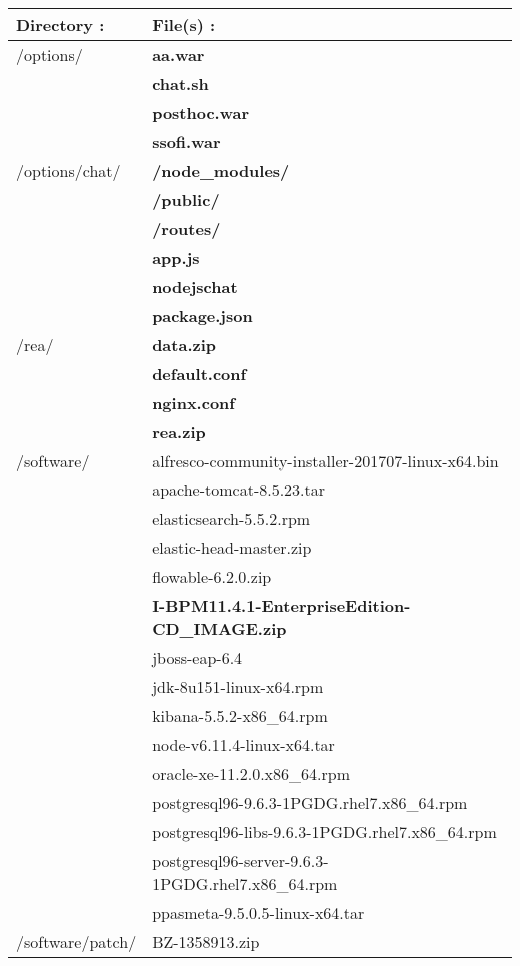 \begin{center}
	\begin{tabular}{|p{2in}|p{4in}|}
	\hline
	\textbf{Directory :} & \textbf{File(s) :}\\
	\hline
	/options/ & \textbf{aa.war}\\
	& \textbf{chat.sh}\\
	& \textbf{posthoc.war}\\
	& \textbf{ssofi.war}\\
	/options/chat/ & \textbf{/node\_modules/}\\
	& \textbf{/public/}\\
	& \textbf{/routes/}\\
	& \textbf{app.js}\\
	& \textbf{nodejschat}\\
	& \textbf{package.json}\\
	\hline
	/rea/ & \textbf{data.zip}\\
	& \textbf{default.conf}\\
	& \textbf{nginx.conf}\\
	& \textbf{rea.zip}\\
	\hline
	/software/ & alfresco-community-installer-201707-linux-x64.bin\\
	& apache-tomcat-8.5.23.tar\\
	& elasticsearch-5.5.2.rpm\\
	& elastic-head-master.zip\\
	& flowable-6.2.0.zip\\
	& \textbf{I-BPM11.4.1-EnterpriseEdition-CD\_IMAGE.zip}\\
	& jboss-eap-6.4\\
	& jdk-8u151-linux-x64.rpm\\
	& kibana-5.5.2-x86\_64.rpm\\
	& node-v6.11.4-linux-x64.tar\\
	& oracle-xe-11.2.0.x86\_64.rpm\\
	& postgresql96-9.6.3-1PGDG.rhel7.x86\_64.rpm\\
	& postgresql96-libs-9.6.3-1PGDG.rhel7.x86\_64.rpm\\
	& postgresql96-server-9.6.3-1PGDG.rhel7.x86\_64.rpm\\
	& ppasmeta-9.5.0.5-linux-x64.tar\\
	/software/patch/ & BZ-1358913.zip\\
	\hline
	\end{tabular}
\end{center}
